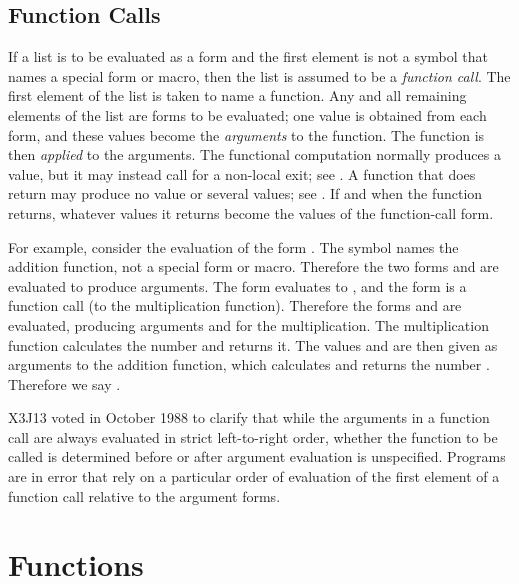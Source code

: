 \subsection{Function Calls}

If a list is to be evaluated as a form and the first element is
not a symbol that names a special form or macro, then the list
is assumed to be a {\it function call}.  The first element of the
list is taken to name a function.  Any and all remaining elements
of the list are forms to be evaluated; one value is obtained
from each form,
and these values become the {\it arguments} to the function.
The function is then {\it applied} to the arguments.
The functional computation normally produces a value,
but it may instead call for a non-local exit; see .
A function that does return may produce no value or several values;
see .
If and when the function returns, whatever values it returns
become the values of the function-call form.


For example, consider the evaluation of the form .
The symbol \cd{+} names the addition function, not a special form or macro.
Therefore the two forms  and  are evaluated to produce
arguments.  The form  evaluates to , and the form
 is a function call (to the multiplication function).
Therefore the forms  and  are evaluated, producing arguments
 and  for the multiplication.  The multiplication function
calculates the number  and returns it.  The values  and 
are then given as arguments to the addition function, which calculates
and returns the number .  Therefore we say .

\begin{newer}
X3J13 voted in October 1988 
to clarify that while the arguments in a function call are always
evaluated in strict left-to-right order, whether the function to
be called is determined before or after argument evaluation
is unspecified.  Programs are in error
that rely on a particular order of evaluation
of the first element of a function call relative to the
argument forms.
\end{newer}

\section{Functions}

